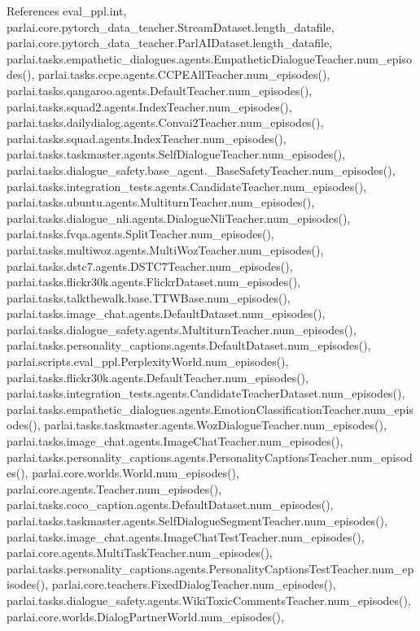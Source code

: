 References eval\+\_\+ppl.\+int, parlai.\+core.\+pytorch\+\_\+data\+\_\+teacher.\+Stream\+Dataset.\+length\+\_\+datafile, parlai.\+core.\+pytorch\+\_\+data\+\_\+teacher.\+Parl\+A\+I\+Dataset.\+length\+\_\+datafile, parlai.\+tasks.\+empathetic\+\_\+dialogues.\+agents.\+Empathetic\+Dialogue\+Teacher.\+num\+\_\+episodes(), parlai.\+tasks.\+ccpe.\+agents.\+C\+C\+P\+E\+All\+Teacher.\+num\+\_\+episodes(), parlai.\+tasks.\+qangaroo.\+agents.\+Default\+Teacher.\+num\+\_\+episodes(), parlai.\+tasks.\+squad2.\+agents.\+Index\+Teacher.\+num\+\_\+episodes(), parlai.\+tasks.\+dailydialog.\+agents.\+Convai2\+Teacher.\+num\+\_\+episodes(), parlai.\+tasks.\+squad.\+agents.\+Index\+Teacher.\+num\+\_\+episodes(), parlai.\+tasks.\+taskmaster.\+agents.\+Self\+Dialogue\+Teacher.\+num\+\_\+episodes(), parlai.\+tasks.\+dialogue\+\_\+safety.\+base\+\_\+agent.\+\_\+\+Base\+Safety\+Teacher.\+num\+\_\+episodes(), parlai.\+tasks.\+integration\+\_\+tests.\+agents.\+Candidate\+Teacher.\+num\+\_\+episodes(), parlai.\+tasks.\+ubuntu.\+agents.\+Multiturn\+Teacher.\+num\+\_\+episodes(), parlai.\+tasks.\+dialogue\+\_\+nli.\+agents.\+Dialogue\+Nli\+Teacher.\+num\+\_\+episodes(), parlai.\+tasks.\+fvqa.\+agents.\+Split\+Teacher.\+num\+\_\+episodes(), parlai.\+tasks.\+multiwoz.\+agents.\+Multi\+Woz\+Teacher.\+num\+\_\+episodes(), parlai.\+tasks.\+dstc7.\+agents.\+D\+S\+T\+C7\+Teacher.\+num\+\_\+episodes(), parlai.\+tasks.\+flickr30k.\+agents.\+Flickr\+Dataset.\+num\+\_\+episodes(), parlai.\+tasks.\+talkthewalk.\+base.\+T\+T\+W\+Base.\+num\+\_\+episodes(), parlai.\+tasks.\+image\+\_\+chat.\+agents.\+Default\+Dataset.\+num\+\_\+episodes(), parlai.\+tasks.\+dialogue\+\_\+safety.\+agents.\+Multiturn\+Teacher.\+num\+\_\+episodes(), parlai.\+tasks.\+personality\+\_\+captions.\+agents.\+Default\+Dataset.\+num\+\_\+episodes(), parlai.\+scripts.\+eval\+\_\+ppl.\+Perplexity\+World.\+num\+\_\+episodes(), parlai.\+tasks.\+flickr30k.\+agents.\+Default\+Teacher.\+num\+\_\+episodes(), parlai.\+tasks.\+integration\+\_\+tests.\+agents.\+Candidate\+Teacher\+Dataset.\+num\+\_\+episodes(), parlai.\+tasks.\+empathetic\+\_\+dialogues.\+agents.\+Emotion\+Classification\+Teacher.\+num\+\_\+episodes(), parlai.\+tasks.\+taskmaster.\+agents.\+Woz\+Dialogue\+Teacher.\+num\+\_\+episodes(), parlai.\+tasks.\+image\+\_\+chat.\+agents.\+Image\+Chat\+Teacher.\+num\+\_\+episodes(), parlai.\+tasks.\+personality\+\_\+captions.\+agents.\+Personality\+Captions\+Teacher.\+num\+\_\+episodes(), parlai.\+core.\+worlds.\+World.\+num\+\_\+episodes(), parlai.\+core.\+agents.\+Teacher.\+num\+\_\+episodes(), parlai.\+tasks.\+coco\+\_\+caption.\+agents.\+Default\+Dataset.\+num\+\_\+episodes(), parlai.\+tasks.\+taskmaster.\+agents.\+Self\+Dialogue\+Segment\+Teacher.\+num\+\_\+episodes(), parlai.\+tasks.\+image\+\_\+chat.\+agents.\+Image\+Chat\+Test\+Teacher.\+num\+\_\+episodes(), parlai.\+core.\+agents.\+Multi\+Task\+Teacher.\+num\+\_\+episodes(), parlai.\+tasks.\+personality\+\_\+captions.\+agents.\+Personality\+Captions\+Test\+Teacher.\+num\+\_\+episodes(), parlai.\+core.\+teachers.\+Fixed\+Dialog\+Teacher.\+num\+\_\+episodes(), parlai.\+tasks.\+dialogue\+\_\+safety.\+agents.\+Wiki\+Toxic\+Comments\+Teacher.\+num\+\_\+episodes(), parlai.\+core.\+worlds.\+Dialog\+Partner\+World.\+num\+\_\+episodes(), 